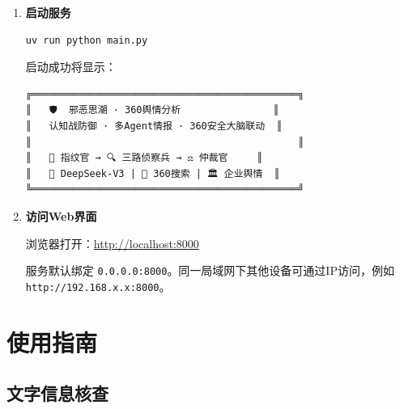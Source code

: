 \documentclass[12pt,a4paper]{ctexart}
\begin{document}
\begin{enumerate}[leftmargin=*]
\begin{lstlisting}[language=bash]
# 百度飞桨OCR API (图片审查需要)
BAIDU_OCR_API_KEY=xxxxxxxxxxxxxxxx
BAIDU_OCR_SECRET_KEY=xxxxxxxxxxxxxxxx

# Firecrawl API (深度网页抓取)
FIRECRAWL_API_KEY=fc-xxxxxxxxxxxxxxxx
\end{lstlisting}

\begin{warnbox}
\texttt{.env} 文件包含敏感API密钥，已加入 \texttt{.gitignore}，不会被提交到版本控制。
\end{warnbox}

\item \textbf{启动服务}

\begin{lstlisting}[language=bash]
uv run python main.py
\end{lstlisting}

启动成功将显示：

\begin{lstlisting}
╔══════════════════════════════════════════════╗
║   🛡️  邪恶思潮 · 360舆情分析                ║
║   认知战防御 · 多Agent情报 · 360安全大脑联动  ║
║                                              ║
║   🧬 指纹官 → 🔍 三路侦察兵 → ⚖️ 仲裁官     ║
║   🧠 DeepSeek-V3 | 🔗 360搜索 | 🏛️ 企业舆情  ║
╚══════════════════════════════════════════════╝
\end{lstlisting}

\item \textbf{访问Web界面}

浏览器打开：\url{http://localhost:8000}

\begin{infobox}
服务默认绑定 \texttt{0.0.0.0:8000}。同一局域网下其他设备可通过IP访问，例如 \texttt{http://192.168.x.x:8000}。
\end{infobox}

\end{enumerate}

\section{使用指南}

\subsection{文字信息核查}
\end{document}
